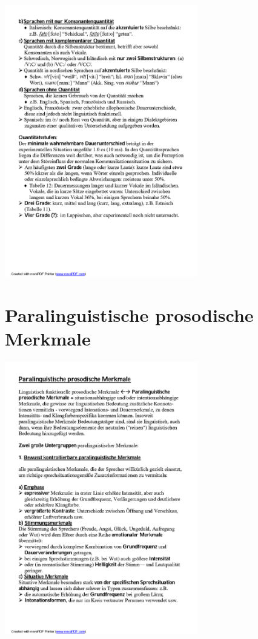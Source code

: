 \documentclass[
  letterpaper,
]{scrbook}
\begin{document}
\includegraphics[width=3.31in,height=\textheight]{./pictures/prosodie/06_Prosodie_Folie_2005-06_R_Page15.png}

\hypertarget{paralinguistische-prosodische-merkmale}{%
\section{Paralinguistische prosodische
Merkmale}\label{paralinguistische-prosodische-merkmale}}

\includegraphics[width=3.31in,height=\textheight]{./pictures/prosodie/06_Prosodie_Folie_2005-06_R_Page16.png}
\end{document}
